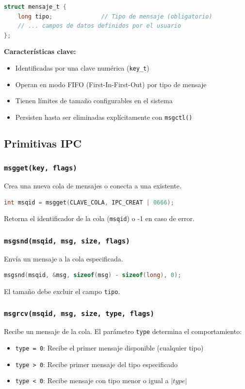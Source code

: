 \documentclass[10pt]{article}
\begin{document}
\begin{lstlisting}[language=C, caption=Estructura básica de un mensaje]
struct mensaje_t {
    long tipo;              // Tipo de mensaje (obligatorio)
    // ... campos de datos definidos por el usuario
};
\end{lstlisting}

\textbf{Características clave:}
\begin{itemize}
  \item Identificadas por una clave numérica (\texttt{key\_t})
  \item Operan en modo FIFO (First-In-First-Out) por tipo de mensaje
  \item Tienen límites de tamaño configurables en el sistema
  \item Persisten hasta ser eliminadas explícitamente con \texttt{msgctl()}
\end{itemize}

\subsection{Primitivas IPC}

\subsubsection{\texttt{msgget(key, flags)}}
Crea una nueva cola de mensajes o conecta a una existente.
\begin{lstlisting}[language=C]
int msqid = msgget(CLAVE_COLA, IPC_CREAT | 0666);
\end{lstlisting}
Retorna el identificador de la cola (\texttt{msqid}) o -1 en caso de error.

\subsubsection{\texttt{msgsnd(msqid, msg, size, flags)}}
Envía un mensaje a la cola especificada.
\begin{lstlisting}[language=C]
msgsnd(msqid, &msg, sizeof(msg) - sizeof(long), 0);
\end{lstlisting}
El tamaño debe excluir el campo \texttt{tipo}.

\subsubsection{\texttt{msgrcv(msqid, msg, size, type, flags)}}
Recibe un mensaje de la cola. El parámetro \texttt{type} determina el comportamiento:
\begin{itemize}
  \item \texttt{type = 0}: Recibe el primer mensaje disponible (cualquier tipo)
  \item \texttt{type > 0}: Recibe primer mensaje del tipo especificado
  \item \texttt{type < 0}: Recibe mensaje con tipo menor o igual a $|type|$
\end{itemize}
\end{document}
